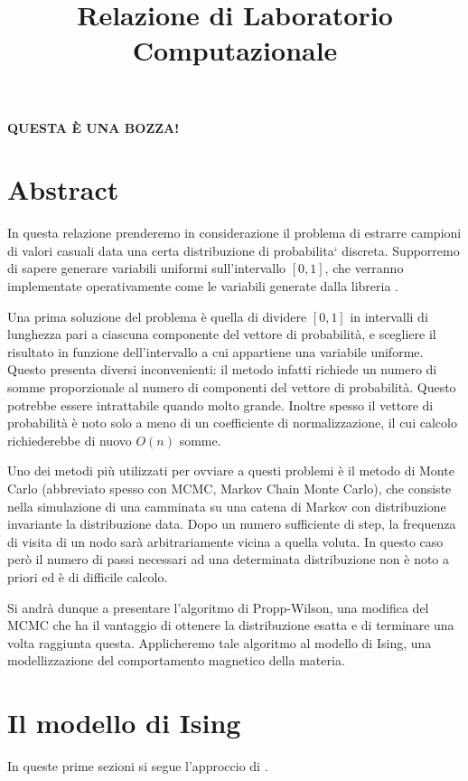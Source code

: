 \documentclass[]{marticle}
\title{\textbf{\Huge Relazione di Laboratorio Computazionale}}
\date{}
\begin{document}
\maketitle

\textbf{QUESTA \`E UNA BOZZA!}

\section*{Abstract}
In questa relazione prenderemo in considerazione il problema di estrarre
campioni di valori casuali data una certa distribuzione di probabilita` discreta.
Supporremo di sapere generare variabili uniformi sull'intervallo $[0,1]$, che
verranno implementate operativamente come le variabili generate dalla libreria
.

Una prima soluzione del problema \`e quella di dividere $[0,1]$ in intervalli di
lunghezza pari a ciascuna componente del vettore di probabilit\`a, e scegliere
il risultato in funzione dell'intervallo a cui appartiene una variabile
uniforme. Questo presenta diversi inconvenienti: il metodo infatti richiede un
numero di somme proporzionale al numero di componenti del vettore di
probabilit\`a. Questo potrebbe essere intrattabile quando molto grande. Inoltre
spesso il vettore di probabilit\`a \`e noto solo a meno di un coefficiente di
normalizzazione, il cui calcolo richiederebbe di nuovo $O(n)$ somme. 

Uno dei metodi pi\`u utilizzati per ovviare a questi problemi \`e il metodo di
Monte Carlo (abbreviato spesso con MCMC, Markov Chain Monte Carlo), che consiste
nella simulazione di una camminata su una catena di Markov con distribuzione
invariante la distribuzione data. Dopo un numero sufficiente di step, la
frequenza di visita di un nodo sar\`a arbitrariamente vicina a quella voluta. In
questo caso per\`o il numero di passi necessari ad una determinata distribuzione
non \`e noto a priori ed \`e di difficile calcolo.

Si andr\`a dunque a presentare l'algoritmo di Propp-Wilson, una modifica del
MCMC che ha il vantaggio di ottenere la distribuzione esatta e di terminare una
volta raggiunta questa. Applicheremo tale algoritmo al modello di Ising, una
modellizzazione del comportamento magnetico della materia.

\section{Il modello di Ising}
In queste prime sezioni si segue l'approccio di \cite{bremaud}.
\end{document}
